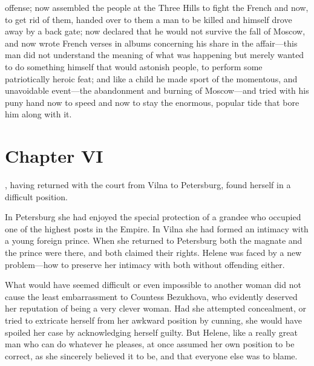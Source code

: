 offense; now assembled the people at the Three Hills to fight the
French and now, to get rid of them, handed over to them a man to
be killed and himself drove away by a back gate; now declared
that he would not survive the fall of Moscow, and now wrote
French verses in albums concerning his share in the affair---this
man did not understand the meaning of what was happening but
merely wanted to do something himself that would astonish people,
to perform some patriotically heroic feat; and like a child he
made sport of the momentous, and unavoidable event---the
abandonment and burning of Moscow---and tried with his puny hand
now to speed and now to stay the enormous, popular tide that bore
him along with it.


\chapter*{Chapter VI} \ifaudio {}
\fi

, having returned with the court from Vilna to Petersburg,
found herself in a difficult position.

In Petersburg she had enjoyed the special protection of a grandee
who occupied one of the highest posts in the Empire. In Vilna she
had formed an intimacy with a young foreign prince. When she
returned to Petersburg both the magnate and the prince were
there, and both claimed their rights. Helene was faced by a new
problem---how to preserve her intimacy with both without
offending either.

What would have seemed difficult or even impossible to another
woman did not cause the least embarrassment to Countess
Bezukhova, who evidently deserved her reputation of being a very
clever woman. Had she attempted concealment, or tried to
extricate herself from her awkward position by cunning, she would
have spoiled her case by acknowledging herself guilty. But
Helene, like a really great man who can do whatever he pleases,
at once assumed her own position to be correct, as she sincerely
believed it to be, and that everyone else was to blame.

